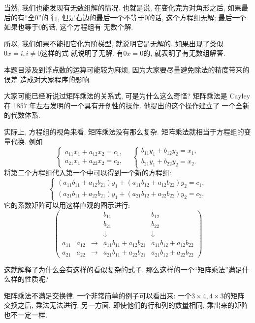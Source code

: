 当然, 我们也能发现有无数组解的情况. 也就是说, 在变化完为对角形之后, 如果最后的有``全0''的 
行, 但是右边的最后一个不等于0的话, 这个方程组无解; 最后一个如果也等于0的话, 这个方程组有
无数个解. 

所以, 我们如果不能把它化为阶梯型, 就说明它是无解的. 如果出现了类似$0x=i,i\neq 0$这样的式 
就说明了无解. 有$0x=0$的, 就表明了有无数组解答. 

 本题目涉及到浮点数的运算可能较为麻烦, 因为大家要尽量避免除法的精度带来的误差
造成对大家程序的影响. 

 大家可能已经听说过矩阵乘法的关系式, 可是为什么这么奇怪?
矩阵乘法是 Cayley 在 1857 年左右发明的一个具有开创性的操作. 他提出的这个操作建立了
一个全新的代数体系. 

实际上, 方程组的视角来看, 矩阵乘法没有那么复杂. 矩阵乘法就相当于方程组的变量代换. 例如
$$
\left\{\begin{array}{l}a_{11}x_1+a_{12}x_2=c_1,\\a_{21}x_1+a_{22}x_2=c_2,\end{array}\right.\quad\left\{\begin{array}{l}b_{11}y_1+b_{12}y_2=x_1,\\b_{21}y_1+b_{22}y_2=x_2.\end{array}\right.
$$
将第二个方程组代入第一个中可以得到一个新的方程组: 
$$
\left\{\begin{array}{l}(a_{11}b_{11}+a_{12}b_{21})y_1+(a_{11}b_{12}+a_{12}b_{22})y_2=c_1,\\(a_{21}b_{11}+a_{22}b_{21})y_1+(a_{21}b_{12}+a_{22}b_{22})y_2=c_2,\end{array}\right.
$$
它的系数矩阵可以用这样直观的图示进行: 
$$
\begin{pmatrix} &  &  & b_{11} & b_{12}\\
    &  &  & b_{21} & b_{22}\\
    &  &  & \downarrow & \downarrow\\
   a_{11} & a_{12} & \rightarrow & a_{11}b_{11}+a_{12}b_{21} & a_{11}b_{12}+a_{12}b_{22}\\
   a_{21} & a_{22} & \rightarrow & a_{21}b_{11}+a_{22}b_{21} & a_{21}b_{12}+a_{22}b_{22}
   \end{pmatrix}
$$

这就解释了为什么会有这样的看似复杂的式子. 那么这样的一个``矩阵乘法''满足什么样的性质呢? 

矩阵乘法不满足交换律. 一个非常简单的例子可以看出来: 一个$3\times 4, 4\times 3$的矩阵
交换之后, 乘法无法进行. 另一方面, 即使他们的行和列的数量相同, 乘出来的矩阵也不一定一样. 

